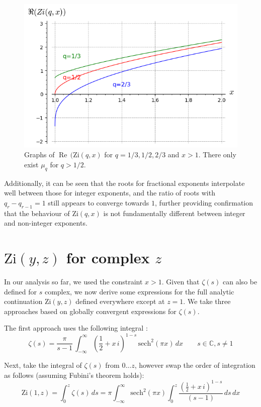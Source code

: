 \documentclass[a4paper,11pt,twoside]{amsart}
\newcommand\Zi{\mathrm{Zi}}
\newcommand\sech{\mathrm{sech}}
\renewcommand\Re{{\operatorname{Re\,}}}
\begin{document}
\begin{figure}[H]
  \includegraphics[width=0.8\linewidth]{RootsZiqx.png}
  \caption{Graphs of $\Re(\Zi(q,x)$ for $q=1/3,1/2,2/3$ and $x > 1$. There only exist $\mu_q$ for $q > 1/2$.}
\end{figure}

Additionally, it can be seen that the roots for fractional exponents interpolate well between those for integer exponents, and the ratio of roots with $q_{r} - q_{r-1} = 1$ still appears to converge towards $1$, further providing confirmation that the behaviour of $\Zi(q,x)$ is not fundamentally different between integer and non-integer exponents.

\section{$\Zi(y,z)$ for complex $z$}

In our analysis so far, we used the constraint $x > 1$. Given that $\zeta(s)$ can also be defined for $s$ complex, we now derive some expressions for the full analytic continuation $\Zi(y,z)$ defined everywhere except at $z=1$. We take three approaches based on globally convergent expressions for $\zeta(s)$.

The first approach uses the following integral \cite{zint}:
\begin{equation}\label{zetcom1}
  \zeta(s) = \frac{\pi}{s-1}\,\int_{-\infty}^{\infty} \left(\frac12+x\, i\right)^{1-s}\, \sech^2(\pi x) \, dx \qquad s \in \mathbb{C}, s \ne 1
\end{equation}

Next, take the integral of $\zeta(s)$ from $0...z$, however swap the order of integration as follows (assuming Fubini's theorem holds):
\begin{equation}\label{zetcom2}
  \Zi(1,z) = \int_0^z \zeta(s)\,ds =\pi \int_{-\infty}^{\infty} \sech^2(\pi x)\int_0^{z} \frac{\left(\frac12+x\, i\right)^{1-s} }{(s-1)} \, ds \, dx
\end{equation}
\end{document}

